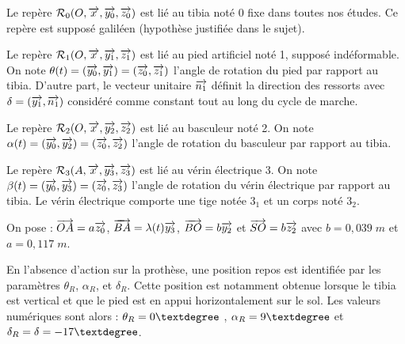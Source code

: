 \documentclass[10pt]{article}
\begin{document}
\begin{minipage}[c]{.54\linewidth}

Le repère $\mathcal{R}_{0} (O, \overrightarrow{x_{}},\overrightarrow{y_{0}} ,\overrightarrow{z_{0}})$ est lié au tibia noté 0 fixe dans toutes nos études. Ce repère est supposé galiléen (hypothèse justifiée dans le sujet).

Le repère $\mathcal{R}_{1} (O, \overrightarrow{x_{}},\overrightarrow{y_{1}} ,\overrightarrow{z_{1}} )$ est lié au pied artificiel noté 1, supposé indéformable. On note $\theta (t)=(\overrightarrow{y_{0}} ,\overrightarrow{y_{1}})=(\overrightarrow{z_{0}},\overrightarrow{z_{1}})$ l'angle de rotation du pied par rapport au tibia. D'autre part, le vecteur unitaire $\overrightarrow{n_1}$ définit la direction des ressorts avec $\delta=(\overrightarrow{y_{1}} ,\overrightarrow{n_1})$ considéré comme constant tout au long
du cycle de marche.

Le repère $\mathcal{R}_{2} (O, \overrightarrow{x_{}} ,\overrightarrow{y_{2}} ,\overrightarrow{z_{2}} )$ est lié au basculeur noté 2. On note $\alpha(t) =(\overrightarrow{y_{0}} ,\overrightarrow{y_{2}})=(\overrightarrow{z_{0}} ,\overrightarrow{z_{2}})$ l'angle de rotation du basculeur par rapport au tibia.

Le repère $\mathcal{R}_{3} ( A, \overrightarrow{x_{}},\overrightarrow{y_{3}} ,\overrightarrow{z_{3}})$ est lié au vérin électrique 3. On note $\beta(t )=(\overrightarrow{y_{0}} ,\overrightarrow{y_{3}})=(\overrightarrow{z_{0}} ,\overrightarrow{z_{3}})$ l'angle de rotation du vérin électrique par rapport au tibia. Le vérin électrique comporte une tige notée $3_1$ et un
corps noté $3_2$.

On pose : $\overrightarrow{OA}=a\overrightarrow{z_0}$, $\overrightarrow{BA}=\lambda(t)\overrightarrow{y_{3}}$, $\overrightarrow{BO}=b\overrightarrow{y_{2}}$ et 
$\overrightarrow{SO}=b\overrightarrow{z_{2}}$ avec $b=0,039 \; m$ et $a=0,117\;m$.

En l'absence d'action sur la prothèse, une position repos est identifiée par les paramètres $\theta_R$, $\alpha_R$, et $\delta_R$. Cette position est notamment obtenue lorsque le tibia est vertical et que le pied est en appui horizontalement
sur le sol. Les valeurs numériques sont alors : $\theta_R=0\textdegree$ , $\alpha_R=9\textdegree$ et $\delta_R=\delta=-17\textdegree$.
\end{minipage} \hfill
\end{document}

